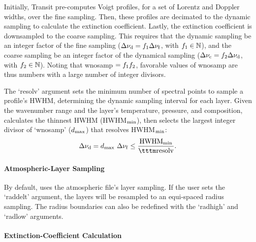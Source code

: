 \documentclass[letterpaper, 12pt]{article}
\begin{document}
Initially, Transit pre-computes Voigt profiles, for a set of Lorentz
and Doppler widths, over the fine sampling.  Then, these profiles are
decimated to the dynamic sampling to calculate the extinction
coefficient.  Lastly, the extinction coefficient is downsampled to the
coarse sampling.  This requires that the dynamic sampling be an
integer factor of the fine sampling ($\Delta\nu\sb{\rm d} =
f\sb{1}\Delta\nu\sb{\rm f}$, with $f\sb{1}\in\mathbb{N}$), and the
coarse sampling be an integer factor of the dynamical sampling
($\Delta\nu\sb{\rm c} = f\sb{2}\Delta\nu\sb{\rm d}$, with
$f\sb{2}\in\mathbb{N}$).  Noting that {\tttb wnosamp} $=
f\sb{1}f\sb{2}$, favorable values of {\tttb wnosamp} are thus numbers
with a large number of integer divisors.

The `{\tttb resolv}' argument  sets the minimum
number of spectral points to sample a profile's HWHM, determining the
dynamic sampling interval for each layer.
Given the wavenumber range and the layer's temperature, pressure, and
composition, {\transit} calculates the thinnest HWHM (HWHM$\sb{\rm
  min}$), then {\transit} selects the largest integer divisor of
{\tttm `wnosamp'} ($d\sb{\rm max}$) that resolves HWHM$\sb{\rm min}$:
\begin{equation}
  \Delta\nu\sb{\rm d} =    d\sb{\rm max}\ \Delta\nu\sb{\rm f} 
                      \leq \frac{\rm HWHM\sb{min}}{\tttm \rm{resolv}}.
\end{equation}



\paragraph{Atmospheric-Layer  Sampling}

By default, {\transit} uses the atmospheric file's layer sampling.  If
the user sets the `{\tttb raddelt}' argument, the layers will be
resampled to an equi-spaced radius sampling.  The radius boundaries
can also be redefined with the `{\tttb radhigh}' and `{\tttb radlow}'
arguments.

\paragraph{Extinction-Coefficient Calculation}
\label{sec:opacity}
\end{document}
